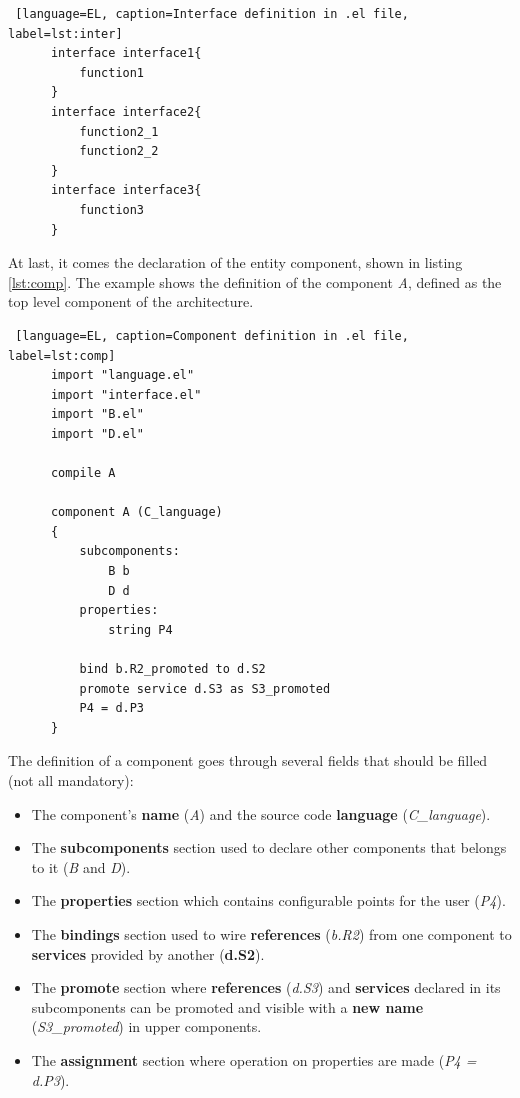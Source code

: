 \begin{lstlisting} [language=EL, caption=Interface definition in .el file, label=lst:inter]
      interface interface1{
          function1
      }
      interface interface2{
          function2_1  
          function2_2
      }
      interface interface3{
          function3
      }
\end{lstlisting}



At last, it comes the declaration of the entity component, shown in listing \ref{lst:comp}. The example shows the definition of the component \textit{A}, defined as the top level component of the architecture. 

\begin{lstlisting} [language=EL, caption=Component definition in .el file, label=lst:comp]
      import "language.el"
      import "interface.el"
      import "B.el"
      import "D.el"

      compile A

      component A (C_language)
      {
          subcomponents:
              B b
              D d
          properties:
              string P4
              
          bind b.R2_promoted to d.S2
          promote service d.S3 as S3_promoted
          P4 = d.P3
      }
\end{lstlisting}

The definition of a component goes through several fields that should be filled (not all mandatory):

\begin{itemize}
\item The component's \textbf{name} (\textit{A}) and the source code \textbf{language} (\textit{C\_language}).
\item The \textbf{subcomponents} section used to declare other components that belongs to it (\textit{B} and \textit{D}).
\item The \textbf{properties} section which contains configurable points for the user (\textit{P4}).
\item The \textbf{bindings} section used to wire \textbf{references} (\textit{b.R2}) from one component to \textbf{services} provided by another (\textbf{d.S2}).
\item The \textbf{promote} section where \textbf{references} (\textit{d.S3}) and \textbf{services} declared in its subcomponents can be promoted and visible with a \textbf{new name} (\textit{S3\_promoted}) in upper components.
\item The \textbf{assignment} section where operation on properties are made (\textit{P4 = d.P3}).
\end{itemize}

